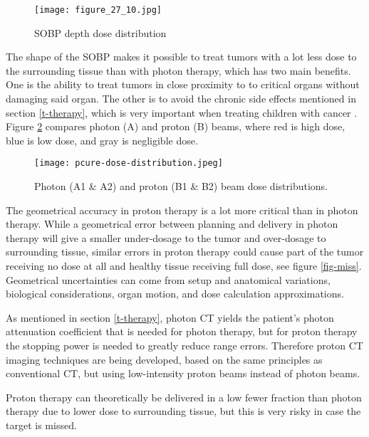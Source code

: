 \documentclass[../main/thesis.tex]{subfiles}
\begin{document}
\begin{figure}%
	\centering
	\texttt{[image: figure\_27\_10.jpg]}
	\caption{\gls{SOBP} depth dose distribution \citep[fig. 27.10]{Khan}}
	\label{fig-sobp}
\end{figure}


The shape of the \gls{SOBP} makes it possible to treat tumors with a lot less dose to the surrounding tissue than with photon therapy, which has two main benefits. One is the ability to treat tumors in close proximity to to critical organs without damaging said organ. The other is to avoid the chronic side effects mentioned in section \ref{t-therapy}, which is very important when treating children with cancer \citep[chap. 27]{Khan}. Figure \ref{fig-photonproton-dose} compares photon (A) and proton (B) beams, where red is high dose, blue is low dose, and gray is negligible dose. 

\begin{figure}%
	\centering
	\texttt{[image: pcure-dose-distribution.jpeg]}
	\caption{Photon (A1 \& A2) and proton (B1 \& B2) beam dose distributions. \citetext{\citeauthor{pcure}}}
	\label{fig-photonproton-dose}
\end{figure}

The geometrical accuracy in proton therapy is a lot more critical than in photon therapy. While a geometrical error between planning and delivery in photon therapy will give a smaller under-dosage to the tumor and over-dosage to surrounding tissue, similar errors in proton therapy could cause part of the tumor receiving no dose at all and healthy tissue receiving full dose, see figure \ref{fig-miss}. Geometrical uncertainties can come from setup and anatomical variations, biological considerations, organ motion, and dose calculation approximations. \citep{Paganetti-range} 

As mentioned in section \ref{t-therapy}, photon \gls{CT} yields the patient's photon attenuation coefficient that is needed for photon therapy, but for proton therapy the stopping power is needed to greatly reduce range errors. Therefore proton \gls{CT} imaging techniques are being developed, based on the same principles as conventional \gls{CT}, but using low-intensity proton beams instead of photon beams. \citep{proton-ct}

Proton therapy can theoretically be delivered in a low fewer fraction than photon therapy due to lower dose to surrounding tissue, but this is very risky in case the target is missed.
\end{document}
